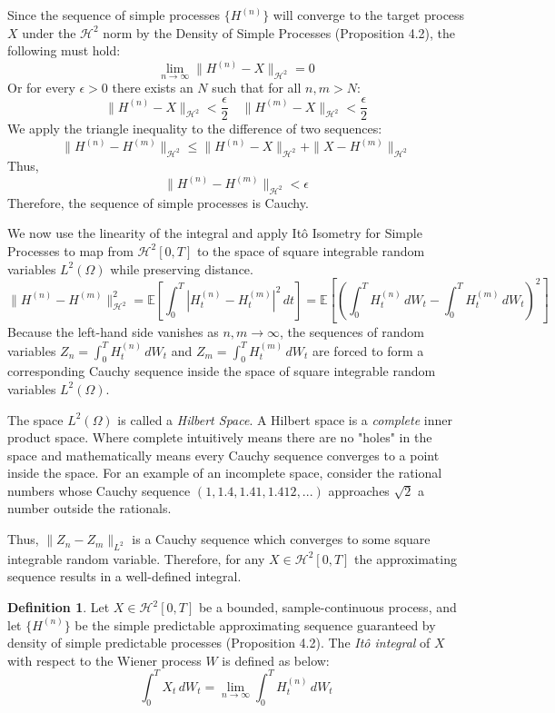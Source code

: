 \documentclass[12pt]{article}
\theoremstyle{definition}
\newtheorem{definition}{Definition}[section]
\theoremstyle{plain}
\theoremstyle{remark}
\begin{document}
Since the sequence of simple processes $\{H^{(n)}\}$ will converge to the target process $X$ under the $\mathcal{H}^2$ norm by the Density of Simple Processes (Proposition 4.2), the following must hold:
\[
\lim_{n\to\infty}\|H^{(n)}-X\|_{\mathcal{H}^2} = 0
\]
Or for every $\epsilon>0$  there exists an $N$ such that for all $n,m>N$:
\[
\|H^{(n)}-X\|_{\mathcal{H}^2} < \frac{\epsilon}{2} \quad \|H^{(m)}-X\|_{\mathcal{H}^2} < \frac{\epsilon}{2}
\]
We apply the triangle inequality to the difference of two sequences:
\[
\|H^{(n)} - H^{(m)}\|_{\mathcal{H}^2} \leq \|H^{(n)} - X\|_{\mathcal{H}^2} + \|X-H^{(m)} \|_{\mathcal{H}^2}
\]
Thus,
\[
\|H^{(n)} - H^{(m)}\|_{\mathcal{H}^2} < \epsilon
\]
Therefore, the sequence of simple processes is Cauchy.

We now use the linearity of the integral and apply It\^o Isometry for Simple Processes to map from $\mathcal{H}^2[0,T]$ to the space of square integrable random variables $L^2(\Omega)$ while preserving distance.
\[
 \|H^{(n)} - H^{(m)}\|_{\mathcal{H}^2}^2 =\mathbb{E}\left[ \int_0^T \left| H^{(n)}_t - H^{(m)}_t \right|^2 \, dt \right] =\mathbb{E}\left[ \left( \int_0^T H^{(n)}_t \, dW_t - \int_0^T H^{(m)}_t \, dW_t \right)^2 \right]
\]
Because the left-hand side vanishes as $n,m \to \infty$, the sequences of random variables $Z_n = \int_0^T H^{(n)}_t \, dW_t$ and $Z_m = \int_0^T H^{(m)}_t \, dW_t$ are forced to form a corresponding Cauchy sequence inside the space of square integrable random variables $L^2(\Omega)$. 

The space $L^2(\Omega)$ is called a \textit{Hilbert Space}.  A Hilbert space is a \textit{complete} inner product space.  Where complete intuitively means there are no "holes" in the space and mathematically means every Cauchy sequence converges to a point inside the space.  For an example of an incomplete space, consider the rational numbers whose Cauchy sequence $(1,1.4,1.41,1.412,...)$ approaches $\sqrt{2}$ a number outside the rationals.

Thus, $\|Z_n - Z_m\|_{L^2}$ is a Cauchy sequence which converges to some square integrable random variable.  Therefore, for any $X \in \mathcal{H}^2[0,T]$ the approximating sequence results in a well-defined integral.

\begin{definition}
Let $X \in \mathcal{H}^2[0,T]$ be a bounded, sample-continuous process, and let $\{H^{(n)}\}$ be the simple predictable approximating sequence guaranteed by density of simple predictable processes (Proposition 4.2). The \textit{It\^o integral} of $X$ with respect to the Wiener process $W$ is defined as below:
\[
\int_0^T X_t \, dW_t = \lim_{n \to \infty} \int_0^T H^{(n)}_t \, dW_t
\]
\end{definition}
\end{document}
